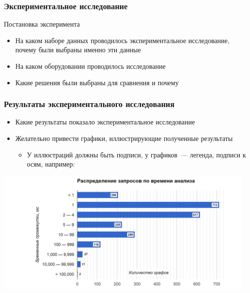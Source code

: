 \documentclass
  [ russian
  , aspectratio=1610 %
  ] {beamer}
\begin{document}
\begin{frame}[t]
    \frametitle{Экспериментальное исследование}
    Постановка эксперимента
    \begin{itemize}
        \item На каком наборе данных проводилось экспериментальное исследование, почему были выбраны именно эти данные
        \item На каком оборудовании проводилось исследование
        \item Какие решения были выбраны для сравнения и почему
    \end{itemize}
\end{frame}

\begin{frame}[t]
    \frametitle{Результаты экспериментального исследования}
    \begin{itemize}
        \item Какие результаты показало экспериментальное исследование
        \item Желательно привести графики, иллюстрирующие полученные результаты
              \begin{itemize}
                  \item У иллюстраций должны быть подписи, у графиков~--- легенда, подписи к осям, например:
              \end{itemize}
    \end{itemize}
    \includegraphics[width=13cm]{figures/dist.png}
\end{frame}
\end{document}
